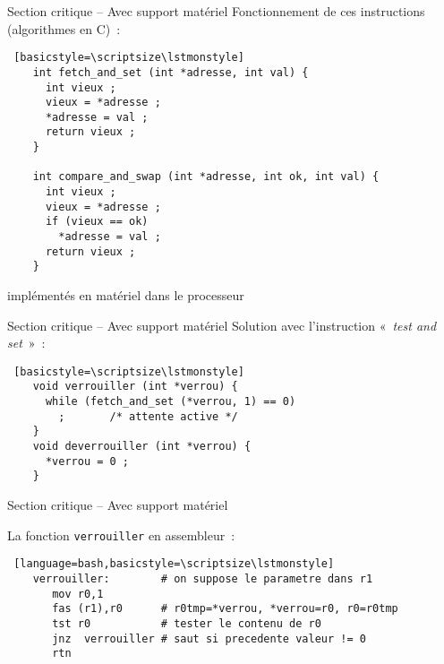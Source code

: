 \begin {frame} [fragile] {Section critique -- Avec support matériel}
    Fonctionnement de ces instructions (algorithmes en C)~:

    \begin {lstlisting} [basicstyle=\scriptsize\lstmonstyle]
    int fetch_and_set (int *adresse, int val) {
      int vieux ;
      vieux = *adresse ;
      *adresse = val ;
      return vieux ;
    }

    int compare_and_swap (int *adresse, int ok, int val) {
      int vieux ;
      vieux = *adresse ;
      if (vieux == ok)
        *adresse = val ;
      return vieux ;
    }
    \end{lstlisting}

    \implique implémentés en matériel dans le processeur

\end{frame}


\begin {frame} [fragile] {Section critique -- Avec support matériel}
    Solution avec l'instruction «~\emph {test and set}~»~:

    \begin {lstlisting} [basicstyle=\scriptsize\lstmonstyle]
    void verrouiller (int *verrou) {
      while (fetch_and_set (*verrou, 1) == 0)
        ;       /* attente active */
    }
    void deverrouiller (int *verrou) {
      *verrou = 0 ;
    }
    \end{lstlisting}

\end{frame}

\begin {frame} [fragile] {Section critique -- Avec support matériel}

    La fonction \texttt {verrouiller} en assembleur~:

    \begin {lstlisting} [language=bash,basicstyle=\scriptsize\lstmonstyle]
    verrouiller:        # on suppose le parametre dans r1
       mov r0,1
       fas (r1),r0      # r0tmp=*verrou, *verrou=r0, r0=r0tmp
       tst r0           # tester le contenu de r0
       jnz  verrouiller # saut si precedente valeur != 0
       rtn
    \end{lstlisting}

\end{frame}

